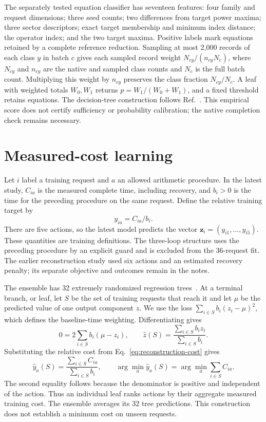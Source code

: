 The separately tested equation classifier has seventeen features: four family and request dimensions; three seed counts; two differences from target power maxima; three sector descriptors; exact target membership and minimum index distance; the operator index; and the two target maxima. Positive labels mark equations retained by a complete reference reduction. Sampling at most 2,000 records of each class $y$ in batch $c$ gives each sampled record weight $N_{cy}/(n_{cy}N_c)$, where $N_{cy}$ and $n_{cy}$ are the native and sampled class counts and $N_c$ is the full batch count. Multiplying this weight by $n_{cy}$ preserves the class fraction $N_{cy}/N_c$. A leaf with weighted totals $W_0,W_1$ returns $p=W_1/(W_0+W_1)$, and a fixed threshold retains equations. The decision-tree construction follows Ref.~\cite{CART1984}. This empirical score does not certify sufficiency or probability calibration; the native completion check remains necessary.

\section{Measured-cost learning}
\label{app:shared}
Let $i$ label a training request and $a$ an allowed arithmetic procedure. In the latest study, $C_{ia}$ is the measured complete time, including recovery, and $b_i>0$ is the time for the preceding procedure on the same request. Define the relative training target by
\begin{equation}
 y_{ia}=C_{ia}/b_i.
 \label{eq:reconstruction-cost}
\end{equation}
There are five actions, so the latest model predicts the vector $\boldsymbol z_i=(y_{i1},\ldots,y_{i5})$. These quantities are training definitions. The three-loop structure uses the preceding procedure by an explicit guard and is excluded from the 36-request fit. The earlier reconstruction study used six actions and an estimated recovery penalty; its separate objective and outcomes remain in the notes.

The ensemble has 32 extremely randomized regression trees~\cite{Geurts2006ExtraTrees}. At a terminal branch, or leaf, let $S$ be the set of training requests that reach it and let $\mu$ be the predicted value of one output component $z$. We use the loss $\sum_{i\in S}b_i(z_i-\mu)^2$, which defines the baseline-time weighting. Differentiating gives
\begin{equation}
 0=2\sum_{i\in S}b_i(\mu-z_i),\qquad
 \widehat z(S)=\frac{\sum_{i\in S}b_i z_i}{\sum_{i\in S}b_i}.
 \label{eq:reconstruction-leaf}
\end{equation}
Substituting the relative cost from Eq.~\eqref{eq:reconstruction-cost} gives
\begin{equation}
 \widehat y_a(S)=\frac{\sum_{i\in S}C_{ia}}{\sum_{i\in S}b_i},
 \qquad
 \arg\min_a\widehat y_a(S)=\arg\min_a\sum_{i\in S}C_{ia}.
 \label{eq:reconstruction-leaf-choice}
\end{equation}
The second equality follows because the denominator is positive and independent of the action. Thus an individual leaf ranks actions by their aggregate measured training cost. The ensemble averages its 32 tree predictions. This construction does not establish a minimum cost on unseen requests.

